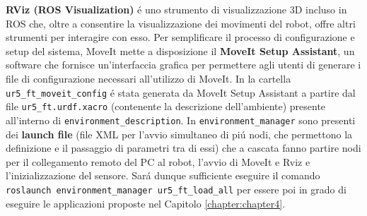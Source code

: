 \textbf{RViz (ROS Visualization)} \'{e} uno strumento di visualizzazione 3D incluso in ROS che, oltre a consentire la visualizzazione 
dei movimenti del robot, offre altri strumenti per interagire con esso.  
Per semplificare il processo di configurazione e setup del sistema, MoveIt mette a disposizione il \textbf{MoveIt Setup Assistant},  
un software che fornisce un'interfaccia grafica per permettere agli utenti di generare i file di configurazione necessari 
all'utilizzo di MoveIt. 
In \cite{environment_setup} la cartella \verb|ur5_ft_moveit_config| \'{e} stata generata da MoveIt Setup Assistant a partire 
dal file \verb|ur5_ft.urdf.xacro| (contenente la descrizione dell'ambiente) presente all'interno di \verb|environment_description|. 
In \verb|environment_manager| sono presenti dei \textbf{launch file} (file XML per l'avvio simultaneo di pi\'{u} nodi, che 
permettono la definizione e il passaggio di parametri tra di essi) che a cascata fanno partire nodi per il collegamento remoto del 
PC al robot, l'avvio di MoveIt e Rviz e l'inizializzazione del sensore. 
Sar\'{a} dunque sufficiente eseguire il comando \verb|roslaunch environment_manager ur5_ft_load_all| per essere poi in grado di 
eseguire le applicazioni proposte nel Capitolo \ref{chapter:chapter4}.